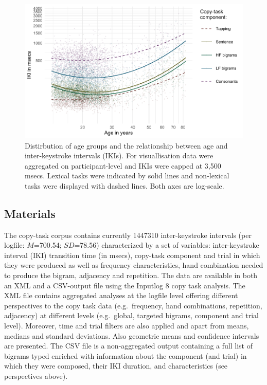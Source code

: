 \documentclass[,man,floatsintext]{apa6}
\begin{document}
\begin{figure}[!h]

{\centering \includegraphics{ct_files/figure-latex/unnamed-chunk-2-1} 

}

\caption{\label{fig:age}Distirbution of age groups and the relationship between age and inter-keystroke intervals (IKIs). For visuallisation data were aggregated on participant-level and IKIs were capped at 3,500 msecs. Lexical tasks were indicated by solid lines and non-lexical tasks were displayed with dashed lines. Both axes are log-scale.}\label{fig:unnamed-chunk-2}
\end{figure}

\hypertarget{materials}{%
\subsection{Materials}\label{materials}}

The copy-task corpus contains currently 1447310 inter-keystroke intervals (per logfile: \(M\)=700.54; \(SD\)=78.56) characterized by a set of variables: inter-keystroke interval (IKI) transition time (in msecs), copy-task component and trial in which they were produced as well as frequency characteristics, hand combination needed to produce the bigram, adjacency and repetition. The data are available in both an XML and a CSV-output file using the Inputlog 8 copy task analysis. The XML file contains aggregated analyses at the logfile level offering different perspectives to the copy task data (e.g.~frequency, hand combinations, repetition, adjacency) at different levels (e.g.~global, targeted bigrams, component and trial level). Moreover, time and trial filters are also applied and apart from means, medians and standard deviations. Also geometric means and confidence intervals are presented. The CSV file is a non-aggregated output containing a full list of bigrams typed enriched with information about the component (and trial) in which they were composed, their IKI duration, and characteristics (see perspectives above).
\end{document}
